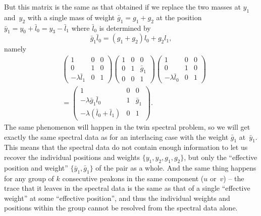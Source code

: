 \documentclass[10pt,a4paper]{article} \pdfoutput=1 
\begin{document}
But this matrix is the same as that obtained if we replace the two masses at $y_1$ and~$y_2$
with a single mass of weight $\bar{g}_1 = g_1 + g_2$
at the position $\bar{y}_1 = y_0 + \bar{l}_0 = y_3 - \bar{l}_1$ where $\bar{l}_0$ is determined by
\begin{equation*}
  \bar{g}_1 \bar{l}_0 = (g_{1} + g_{2}) l_{0} + g_{2} l_{1}
  ,
\end{equation*}
namely
\begin{equation*}
  \begin{split}
    &
    \begin{pmatrix} 1 & 0 & 0 \\ 0 & 1 & 0 \\ -\lambda \bar{l}_{1} & 0 & 1 \end{pmatrix}
    \begin{pmatrix} 1 & 0 & 0 \\ 0 & 1 & \bar{g}_{1} \\ 0 & 0 & 1 \end{pmatrix}
    \begin{pmatrix} 1 & 0 & 0 \\ 0 & 1 & 0 \\ -\lambda \bar{l}_{0} & 0 & 1 \end{pmatrix}
    \\ &
    =
    \begin{pmatrix} 1 & 0 & 0 \\ -\lambda \bar{g}_{1} \bar{l}_{0} & 1 & \bar{g}_{1} \\ -\lambda ( \bar{l}_{0} + \bar{l}_{1}) & 0 & 1 \end{pmatrix}
    .
  \end{split}
\end{equation*}
The same phenomenon will happen in the twin spectral problem,
so we will get exactly the same spectral data as for an interlacing case with
the weight $\bar{g}_1$ at~$\bar{y}_1$.
This means that the spectral data do not contain enough information to
let us recover the individual positions and weights
$\{ y_1, y_2, g_1, g_2 \}$,
but only the ``effective position and weight'' $\{ \bar{y}_1, \bar{g}_1 \}$
of the pair as a whole.
And the same thing happens for any group of $k$ consecutive peakons in the same
component ($u$ or~$v$) -- the trace that it leaves in the spectral data is the same
as that of a single ``effective weight'' at some ``effective position'',
and thus the individual weights and positions within the group
cannot be resolved from the spectral data alone.
\end{document}
